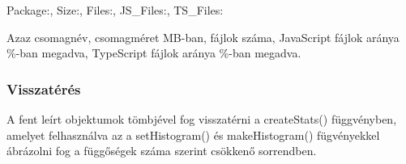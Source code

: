 \begin{js}
	{Package:, Size:, Files:, JS_Files:, TS_Files:}
\end{js}
Azaz csomagnév, csomagméret MB-ban, fájlok száma, JavaScript fájlok aránya \%-ban megadva, TypeScript fájlok aránya \%-ban megadva.

\subsubsection{Visszatérés}

A fent leírt objektumok tömbjével fog visszatérni a createStats() függvényben, amelyet felhasználva az a setHistogram() és makeHistogram() fügvényekkel ábrázolni fog a függőségek száma szerint csökkenő sorrendben.

